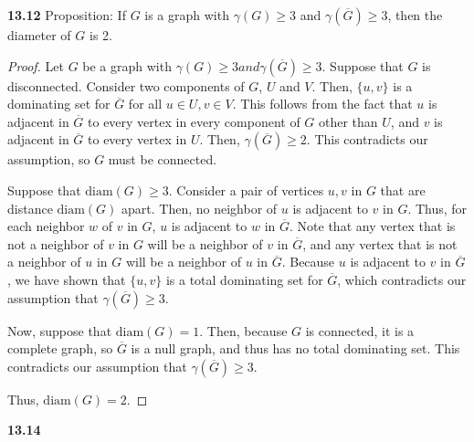\documentclass[12pt]{article}
\begin{document}
\newpage\noindent\textbf{13.12} Proposition: If $G$ is a graph with $\gamma(G) \geq 3$ and $\gamma(\overline G) \geq 3$, then the diameter of $G$ is 2.
\begin{proof}
    Let $G$ be a graph with $\gamma(G) \geq 3 and \gamma(\overline G) \geq 3$.
    Suppose that $G$ is disconnected.
    Consider two components of $G$, $U$ and $V$.
    Then, $\{u, v\}$ is a dominating set for $\overline G$ for all $u \in U, v \in V$.
    This follows from the fact that $u$ is adjacent in $\overline G$ to every vertex in every component of $G$ other than $U$, and $v$ is adjacent in $\overline G$ to every vertex in $U$.
    Then, $\gamma(\overline G) \geq 2$.
    This contradicts our assumption, so $G$ must be connected.

    Suppose that $\text{diam}(G) \geq 3$.
    Consider a pair of vertices $u,v$ in $G$ that are distance $\text{diam}(G)$ apart.
    Then, no neighbor of $u$ is adjacent to $v$ in $G$.
    Thus, for each neighbor $w$ of $v$ in $G$, $u$ is adjacent to $w$ in $\overline G$.
    Note that any vertex that is not a neighbor of $v$ in $G$ will be a neighbor of $v$ in $\overline G$, and any vertex that is not a neighbor of $u$ in $G$ will be a neighbor of $u$ in $\overline G$.
    Because $u$ is adjacent to $v$ in $\overline G$, we have shown that $\{u, v\}$ is a total dominating set for $\overline G$, which contradicts our assumption that $\gamma(\overline G) \geq 3$.

    Now, suppose that $\text{diam}(G) = 1$.
    Then, because $G$ is connected, it is a complete graph, so $\overline G$ is a null graph, and thus has no total dominating set.
    This contradicts our assumption that $\gamma(\overline G) \geq 3$.

    Thus, $\text{diam}(G) = 2$.

\end{proof}

\newpage\noindent\textbf{13.14}
\end{document}
